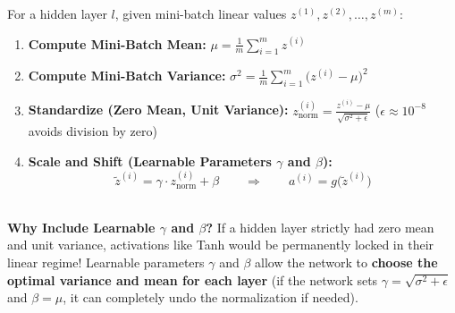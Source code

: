 \documentclass[10pt,a4paper]{article}
\begin{document}
\begin{tcolorbox}[
    colframe=themeblue, colback=lightbg, coltitle=white,
    fonttitle=\bfseries\sffamily\small,
    title={Batch Normalization in 4 Steps (Mini-Batch of size $m$)},
    arc=1.3mm, boxrule=0.5pt, left=5pt, right=5pt, top=2pt, bottom=2pt
]
\footnotesize
For a hidden layer $l$, given mini-batch linear values $z^{(1)}, z^{(2)}, \dots, z^{(m)}$:
\begin{enumerate}[leftmargin=12pt, itemsep=1.5pt, topsep=0.5pt]
    \item \textbf{Compute Mini-Batch Mean:} $\mu = \frac{1}{m} \sum_{i=1}^m z^{(i)}$
    \item \textbf{Compute Mini-Batch Variance:} $\sigma^2 = \frac{1}{m} \sum_{i=1}^m \big(z^{(i)} - \mu\big)^2$
    \item \textbf{Standardize (Zero Mean, Unit Variance):} $z_{\text{norm}}^{(i)} = \frac{z^{(i)} - \mu}{\sqrt{\sigma^2 + \epsilon}}$ \quad ($\epsilon \approx 10^{-8}$ avoids division by zero)
    \item \textbf{Scale and Shift (Learnable Parameters $\gamma$ and $\beta$):}
    \[
    \tilde{z}^{(i)} = \gamma \cdot z_{\text{norm}}^{(i)} + \beta \qquad \Longrightarrow \qquad a^{(i)} = g\big(\tilde{z}^{(i)}\big)
    \]
\end{enumerate}
\hrulefill\\[1pt]
\textbf{Why Include Learnable $\gamma$ and $\beta$?}
If a hidden layer strictly had zero mean and unit variance, activations like Tanh would be permanently locked in their linear regime! Learnable parameters $\gamma$ and $\beta$ allow the network to \textbf{choose the optimal variance and mean for each layer} (if the network sets $\gamma = \sqrt{\sigma^2+\epsilon}$ and $\beta = \mu$, it can completely undo the normalization if needed).
\end{tcolorbox}

\vspace{-2pt}
\end{document}
